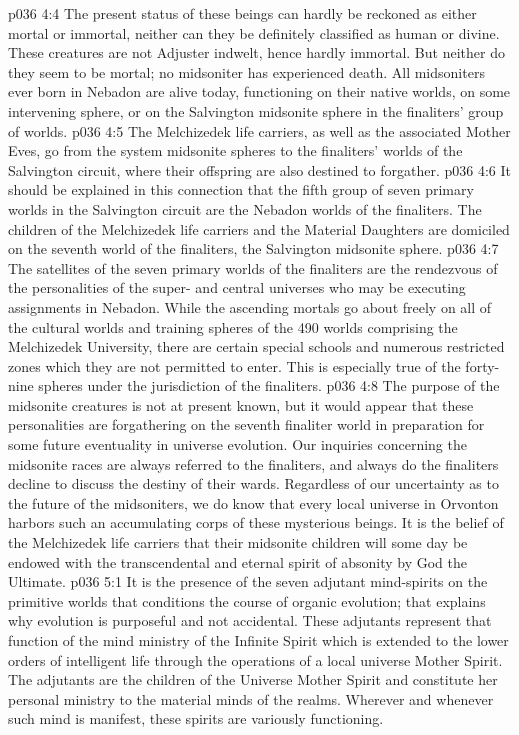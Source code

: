 \vs p036 4:4 The present status of these beings can hardly be reckoned as either mortal or immortal, neither can they be definitely classified as human or divine. These creatures are not Adjuster indwelt, hence hardly immortal. But neither do they seem to be mortal; no midsoniter has experienced death. All midsoniters ever born in Nebadon are alive today, functioning on their native worlds, on some intervening sphere, or on the Salvington midsonite sphere in the finaliters’ group of worlds.
\vs p036 4:5 \pc {} The Melchizedek life carriers, as well as the associated Mother Eves, go from the system midsonite spheres to the finaliters’ worlds of the Salvington circuit, where their offspring are also destined to forgather.
\vs p036 4:6 It should be explained in this connection that the fifth group of seven primary worlds in the Salvington circuit are the Nebadon worlds of the finaliters. The children of the Melchizedek life carriers and the Material Daughters are domiciled on the seventh world of the finaliters, the Salvington midsonite sphere.
\vs p036 4:7 The satellites of the seven primary worlds of the finaliters are the rendezvous of the personalities of the super\hyp{} and central universes who may be executing assignments in Nebadon. While the ascending mortals go about freely on all of the cultural worlds and training spheres of the 490 worlds comprising the Melchizedek University, there are certain special schools and numerous restricted zones which they are not permitted to enter. This is especially true of the forty\hyp{}nine spheres under the jurisdiction of the finaliters.
\vs p036 4:8 \pc The purpose of the midsonite creatures is not at present known, but it would appear that these personalities are forgathering on the seventh finaliter world in preparation for some future eventuality in universe evolution. Our inquiries concerning the midsonite races are always referred to the finaliters, and always do the finaliters decline to discuss the destiny of their wards. Regardless of our uncertainty as to the future of the midsoniters, we do know that every local universe in Orvonton harbors such an accumulating corps of these mysterious beings. It is the belief of the Melchizedek life carriers that their midsonite children will some day be endowed with the transcendental and eternal spirit of absonity by God the Ultimate.
\vs p036 5:1 It is the presence of the seven adjutant mind\hyp{}spirits on the primitive worlds that conditions the course of organic evolution; that explains why evolution is purposeful and not accidental. These adjutants represent that function of the mind ministry of the Infinite Spirit which is extended to the lower orders of intelligent life through the operations of a local universe Mother Spirit. The adjutants are the children of the Universe Mother Spirit and constitute her personal ministry to the material minds of the realms. Wherever and whenever such mind is manifest, these spirits are variously functioning.
